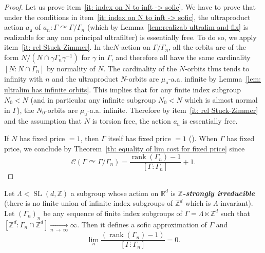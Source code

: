 \documentclass[AHL,Unicode,longabstracts,published]{cedram}
\newcommand{\defin}[1]{\textbf{\emph{#1}}}
\newcommand{\Rmath}{\mathbb{R}}
\newcommand{\Zmath}{\mathbb{Z}}
\newcommand{\acting}{\curvearrowright}
\newcommand{\cost}{\mathcal{C}}
\DeclareMathOperator{\rank}{rank}
\DeclareMathOperator{\SL}{SL}
\newcommand{\ul}{\mathfrak{u}}
\newcommand*{\MK}{\mkern 2mu}
\begin{document}
\begin{proof}
Let us prove item~\eqref{it: index on N to inft -> sofic}. We have to prove that under the conditions in item~\eqref{it: index on N to inft -> sofic}, the ultraproduct action $a_\ul$ of $a_n:\Gamma\acting \Gamma/\Gamma_n$ (which by Lemma~\ref{lem:realizab ultralim and fix} is realizable for any non principal ultrafilter) is essentially free. To do so, we apply item~\eqref{it: rel Stuck-Zimmer}. In the\linebreak$N$-action on $\Gamma/\Gamma_n$, all the orbits are of the form $N/(N\cap \gamma \Gamma_n \gamma^{-1})$ for $\gamma$ in $\Gamma$, and therefore all have the same cardinality $[N:N\cap \Gamma_n]$ by normality of $N$. The cardinality of the $N$-orbits thus tends to infinity with $n$ and the ultraproduct $N$-orbits are $\mu_{\ul}$-a.a. infinite by Lemma~\ref{lem: ultralim has infinite orbits}. This implies that for any finite index subgroup $N_0 <N$ (and in particular any infinite subgroup $N_0<N$ which is almost normal in $\Gamma$), the $N_0$-orbits are $\mu_{\ul}$-a.a. infinite. Therefore by item~\eqref{it: rel Stuck-Zimmer} and the assumption that $N$ is torsion free, the action $a_\ul$ is essentially free.

If $N$ has fixed price $=1$, then $\Gamma$ itself has fixed price $=1$ (\cite[Critère~VI.24$\MK$(2)]{Gab-cost}). When $\Gamma$ has fixed price, we conclude by Theorem~\ref{th: equality of lim cost for fixed price} since
\[
\cost(\Gamma\acting \Gamma/\Gamma_n)=\frac{\rank (\Gamma_n)-1 }{ [\Gamma:\Gamma_n]}+1.
\]
\end{proof}


\begin{theo}\label{th: SLd rel Stuck-Zimmer}
Let $\Lambda<\SL(d,\Zmath)$ a subgroup whose action on $\Rmath^d$ is\linebreak
\defin{$\Zmath$-strongly irreducible} (there is no finite union of infinite index subgroups of $\Zmath^d$ which is $\Lambda$-invariant). Let $(\Gamma_n)_n$ be any sequence of finite index subgroups of $\Gamma=\Lambda\ltimes \Zmath^d$ such that $[\Zmath^d:\Gamma_n\cap \Zmath^d]\underset{n\,\to \,\infty}{\longrightarrow}\infty$. Then it defines a sofic approximation of $\Gamma$ and
\begin{equation}
\lim_{n}
\frac{\left(\rank (\Gamma_n)-1\right)}{ [\Gamma:\Gamma_n]}=0.
\end{equation}
\end{theo}
\end{document}
